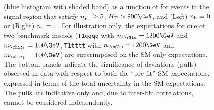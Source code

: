 \begin{figure}[tbhp]
{    (blue histogram with shaded band) as a function of \HTmiss for
    events in the signal region that satisfy $n_{\text{jet}} \geq 5$, $\scalht
    > 800\GeV$, and (Left) $n_{\text{b}} = 0$ or (Right) $n_{\text{b}} = 1$. For
    illustration only, the expectations for one of two benchmark
    models (\texttt{T1qqqq} with $m_{\,\sGlu} = 1200\GeV$ and
    $m_{\chiz_1} = 100\GeV$, \texttt{T1tttt} with $m_{\,\sGlu} =
    1200\GeV$ and $m_{\chiz_1} = 100\GeV$) are superimposed on the
    SM-only expectations. The bottom panels indicate the significance
    of deviations (pulls) observed in data with respect to both the
    ``pre-fit'' SM expectations, expressed in terms of the total
    uncertainty in the SM expectations. The pulls are indicative only
    and, due to inter-bin correlations, cannot be considered
    independently. }
    \label{fig:mht-templates} 
\end{figure}
